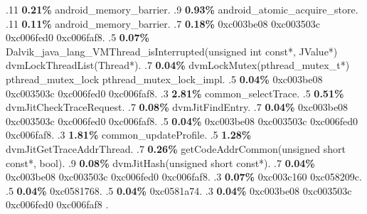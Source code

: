 \begin{profile}
{.11 \textbf{0.21\%} android\_memory\_barrier. 
.9 \textbf{0.93\%} android\_atomic\_acquire\_store. 
.11 \textbf{0.11\%} android\_memory\_barrier. 
.7 \textbf{0.18\%} 0xc003be08\newline {} 0xc003503c\newline {} 0xc006fed0\newline {} 0xc006faf8. 
.5 \textbf{0.07\%} Dalvik\_java\_lang\_VMThread\_isInterrupted(unsigned int const*, JValue*)\newline {} dvmLockThreadList(Thread*). 
.7 \textbf{0.04\%} dvmLockMutex(pthread\_mutex\_t*)\newline {} pthread\_mutex\_lock\newline {} pthread\_mutex\_lock\_impl. 
.5 \textbf{0.04\%} 0xc003be08\newline {} 0xc003503c\newline {} 0xc006fed0\newline {} 0xc006faf8. 
.3 \textbf{2.81\%} common\_selectTrace. 
.5 \textbf{0.51\%} dvmJitCheckTraceRequest. 
.7 \textbf{0.08\%} dvmJitFindEntry. 
.7 \textbf{0.04\%} 0xc003be08\newline {} 0xc003503c\newline {} 0xc006fed0\newline {} 0xc006faf8. 
.5 \textbf{0.04\%} 0xc003be08\newline {} 0xc003503c\newline {} 0xc006fed0\newline {} 0xc006faf8. 
.3 \textbf{1.81\%} common\_updateProfile. 
.5 \textbf{1.28\%} dvmJitGetTraceAddrThread. 
.7 \textbf{0.26\%} getCodeAddrCommon(unsigned short const*, bool). 
.9 \textbf{0.08\%} dvmJitHash(unsigned short const*). 
.7 \textbf{0.04\%} 0xc003be08\newline {} 0xc003503c\newline {} 0xc006fed0\newline {} 0xc006faf8. 
.3 \textbf{0.07\%} 0xc003c160\newline {} 0xc058209c. 
.5 \textbf{0.04\%} 0xc0581768. 
.5 \textbf{0.04\%} 0xc0581a74. 
.3 \textbf{0.04\%} 0xc003be08\newline {} 0xc003503c\newline {} 0xc006fed0\newline {} 0xc006faf8\newline {} . 
}
\end{profile}
